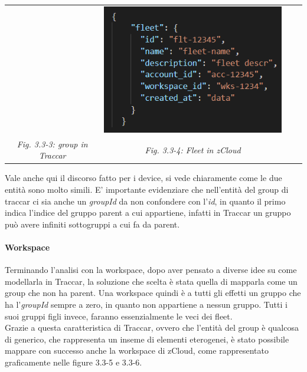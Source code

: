 \documentclass[a4paper,titlepage,12pt]{book}
\begin{document}
{\begin{center}
\begin{tabular}{c c c c}
 &  
\includegraphics[scale=0.7]{images/zClGr.png} \\
\textit{Fig. 3.3-3: group in Traccar} &  \textit{Fig. 3.3-4: Fleet in zCloud}
\end{tabular}
\end{center}\par\medskip


Vale anche qui il discorso fatto per i device, si vede chiaramente come le due entità sono molto simili. E' importante evidenziare che nell'entità del group di  traccar ci sia anche un \textit{groupId} da non confondere con l'\textit{id}, in quanto il primo indica l'indice del gruppo parent a cui appartiene, infatti in Traccar un gruppo può avere infiniti sottogruppi a cui fa da parent. 

\paragraph{
Workspace}
Terminando l'analisi con la workspace, dopo aver pensato a diverse idee su come modellarla in Traccar, la soluzione che scelta è stata quella di mapparla come un group che non ha parent. Una workspace quindi è a tutti gli effetti un gruppo che ha l'\textit{groupId} sempre a zero, in quanto non appartiene a nessun gruppo. Tutti i suoi gruppi figli invece, faranno essenzialmente le veci dei fleet.\\
Grazie a questa caratteristica di Traccar, ovvero che l'entità del group è qualcosa di generico, che rappresenta un inseme di elementi eterogenei, è stato possibile mappare con successo anche la workspace di zCloud, come rappresentato graficamente nelle figure 3.3-5 e 3.3-6.


\begin{center}
\begin{tabular}{c c c cc c c}



\end{tabular}
\end{center}}
\end{document}

